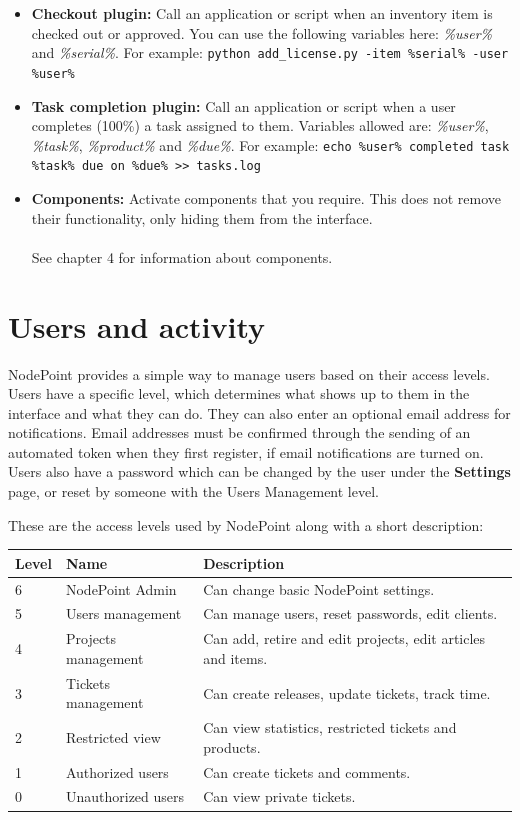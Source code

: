 \documentclass[11pt]{article}
\begin{document}
\begin{itemize}
\item \textbf{Checkout plugin:} Call an application or script when an inventory item is checked out or approved. You can use the following variables here: \textit{\%user\%} and \textit{\%serial\%}. For example: \texttt{python add\_license.py -item \%serial\% -user \%user\%}
\item \textbf{Task completion plugin:} Call an application or script when a user completes (100\%) a task assigned to them. Variables allowed are: \textit{\%user\%}, \textit{\%task\%}, \textit{\%product\%} and \textit{\%due\%}. For example: \texttt{echo \%user\% completed task \%task\% due on \%due\% >> tasks.log}
\item \textbf{Components:} Activate components that you require. This does not remove their functionality, only hiding them from the interface.\\\\See chapter 4 for information about components.
\end{itemize}

\clearpage

\section{Users and activity}
NodePoint provides a simple way to manage users based on their access levels. Users have a specific level, which determines what shows up to them in the interface and what they can do. They can also enter an optional email address for notifications. Email addresses must be confirmed through the sending of an automated token when they first register, if email notifications are turned on. Users also have a password which can be changed by the user under the \textbf{Settings} page, or reset by someone with the Users Management level.

These are the access levels used by NodePoint along with a short description:

\def\arraystretch{1.3} 
\begin{tabular}{ |p{15mm}|p{50mm}|p{100mm}| } 
\hline
\textbf{Level} & \textbf{Name} & \textbf{Description}\\
\hline
6 & NodePoint Admin & Can change basic NodePoint settings.\\
5 & Users management & Can manage users, reset passwords, edit clients.\\
4 & Projects management & Can add, retire and edit projects, edit articles and items.\\
3 & Tickets management & Can create releases, update tickets, track time.\\
2 & Restricted view & Can view statistics, restricted tickets and products.\\
1 & Authorized users & Can create tickets and comments.\\
0 & Unauthorized users & Can view private tickets.\\
\hline
\end{tabular}
\end{document}
